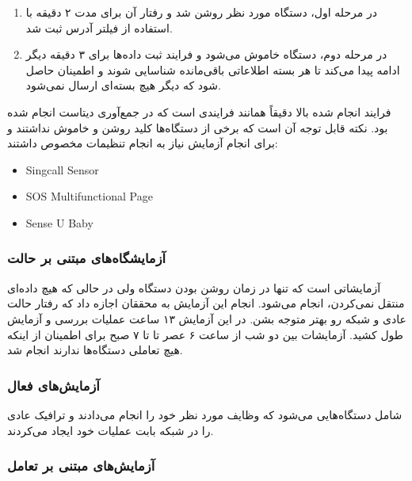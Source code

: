 \begin{enumerate}
    \item در مرحله اول، دستگاه مورد نظر روشن شد و رفتار آن برای مدت ۲ دقیقه با
    استفاده از فیلتر آدرس  ثبت شد.
    \item در مرحله دوم، دستگاه خاموش می‌شود و فرایند ثبت داده‌ها برای ۳ دقیقه
    دیگر ادامه پیدا می‌کند تا هر بسته اطلاعاتی باقی‌مانده شناسایی شوند و اطمینان
    حاصل شود که دیگر هیچ بسته‌ای ارسال نمی‌شود.
\end{enumerate}

فرایند انجام شده بالا دقیقاً همانند فرایندی است که در جمع‌آوری دیتاست
 انجام شده بود. نکته قابل توجه آن است که برخی از دستگاه‌ها کلید
روشن و خاموش نداشتند و برای انجام آزمایش نیاز به انجام تنظیمات مخصوص داشتند:

\begin{LTR}
    \begin{itemize}
        \item Singcall Sensor
        \item SOS Multifunctional Page
        \item Sense U Baby
    \end{itemize}
\end{LTR}

\subsubsection{آزمایشگاه‌های مبتنی بر حالت }

آزمایشاتی است که تنها در زمان روشن بودن دستگاه ولی در حالی که هیچ داده‌ای منتقل
نمی‌کردن، انجام می‌شود. انجام این آزمایش به محققان اجازه داد که رفتار حالت عادی
و  شبکه رو بهتر متوجه بشن. در این آزمایش ۱۳ ساعت عملیات بررسی و
آزمایش طول کشید. آزمایشات بین دو شب از ساعت ۶ عصر تا تا ۷ صبح برای اطمینان از
اینکه هیچ تعاملی دستگاه‌ها ندارند انجام شد.

\subsubsection{آزمایش‌های فعال}

شامل دستگاه‌هایی می‌شود که وظایف مورد نظر خود را انجام می‌دادند و ترافیک عادی را
در شبکه بابت عملیات خود ایجاد می‌کردند.

\subsubsection{آزمایش‌های مبتنی بر تعامل}

